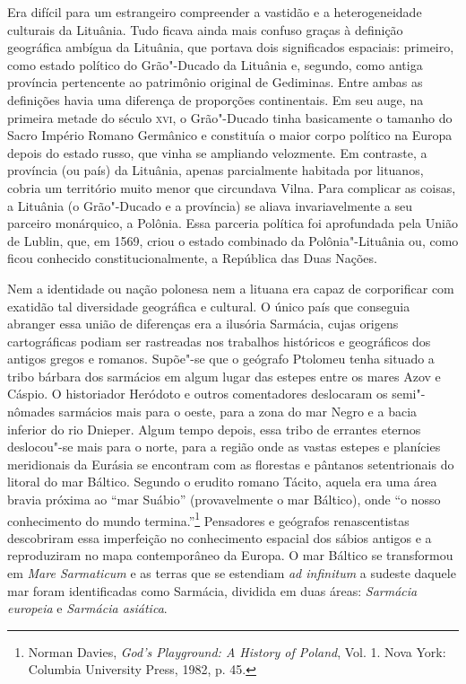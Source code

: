 Era difícil para um estrangeiro compreender a vastidão e a
heterogeneidade culturais da Lituânia. Tudo ficava ainda mais confuso
graças à definição geográfica ambígua da Lituânia, que portava dois
significados espaciais: primeiro, como estado político do Grão"-Ducado da
Lituânia e, segundo, como antiga província pertencente ao patrimônio
original de Gediminas. Entre ambas as definições havia uma diferença de
proporções continentais. Em seu auge, na primeira metade do século \textsc{xvi}, o
Grão"-Ducado tinha basicamente o tamanho do Sacro Império Romano
Germânico e constituía o maior corpo político na Europa depois do estado
russo, que vinha se ampliando velozmente. Em contraste, a província (ou
país) da Lituânia, apenas parcialmente habitada por lituanos, cobria um
território muito menor que circundava Vilna. Para complicar as coisas, a
Lituânia (o Grão"-Ducado e a província) se aliava invariavelmente a seu
parceiro monárquico, a Polônia. Essa parceria política foi aprofundada
pela União de Lublin, que, em 1569, criou o estado combinado da
Polônia"-Lituânia ou, como ficou conhecido constitucionalmente, a
República das Duas Nações.

\asterisc

Nem a identidade ou nação polonesa nem a lituana era capaz de
corporificar com exatidão tal diversidade geográfica e cultural. O único
país que conseguia abranger essa união de diferenças era a ilusória
Sarmácia, cujas origens cartográficas podiam ser rastreadas nos
trabalhos históricos e geográficos dos antigos gregos e romanos.
Supõe"-se que o geógrafo Ptolomeu tenha situado a tribo bárbara dos
sarmácios em algum lugar das estepes entre os mares Azov e Cáspio. O
historiador Heródoto e outros comentadores deslocaram os semi"-nômades
sarmácios mais para o oeste, para a zona do mar Negro e a bacia inferior
do rio Dnieper. Algum tempo depois, essa tribo de errantes eternos
deslocou"-se mais para o norte, para a região onde as vastas estepes e
planícies meridionais da Eurásia se encontram com as florestas e
pântanos setentrionais do litoral do mar Báltico. Segundo o erudito
romano Tácito, aquela era uma área bravia próxima ao ``mar Suábio''
(provavelmente o mar Báltico), onde ``o nosso conhecimento do mundo
termina.''\footnote{Norman Davies, \textit{God's Playground: A History of Poland}, Vol. 1. Nova York: Columbia University Press, 1982, p. 45.} Pensadores e geógrafos renascentistas descobriram essa imperfeição no conhecimento espacial dos sábios antigos e a reproduziram
no mapa contemporâneo da Europa. O mar Báltico se transformou em
\textit{Mare Sarmaticum} e as terras que se estendiam \textit{ad infinitum}
a sudeste daquele mar foram identificadas como Sarmácia, dividida em
duas áreas: \textit{Sarmácia europeia} e \textit{Sarmácia asiática}.


